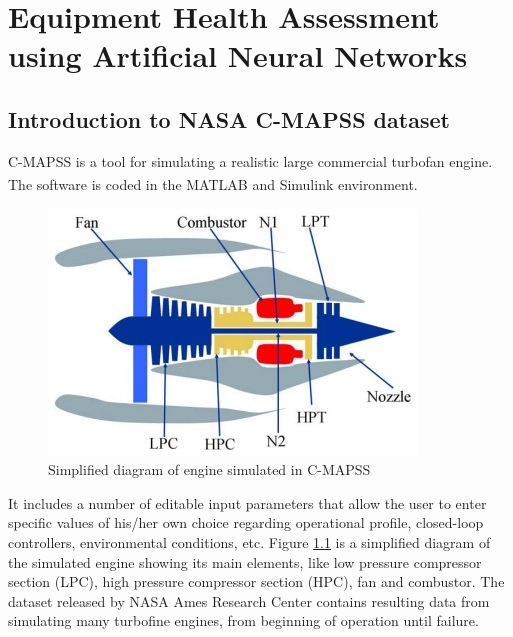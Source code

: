 \chapter{Equipment Health Assessment using Artificial Neural Networks}



\section{Introduction to NASA C-MAPSS dataset}

C-MAPSS is a tool for simulating a realistic large commercial turbofan engine. The software is coded in the MATLAB\textsuperscript{\textregistered} and Simulink\textsuperscript{\textregistered} environment.


\begin{figure}
    \centering
    \includegraphics[width=.48\textwidth]{figures/c-mapss-engine-diagram.jpg}
    \caption{Simplified diagram of engine simulated in C-MAPSS \cite{Saxena2008}}
    \label{figure:c-mapss-engine-diagram}    
\end{figure}
\vspace{-5pt}

It includes a number of editable input parameters that allow the user to enter specific values of his/her own choice regarding operational profile, closed-loop controllers, environmental conditions, etc. \cite{Saxena2008} Figure \ref{figure:c-mapss-engine-diagram} is a simplified diagram of the simulated engine showing its main elements, like low pressure compressor section (LPC), high pressure compressor section (HPC), fan and combustor. The dataset released by NASA Ames Research Center contains resulting data from simulating many turbofine engines, from beginning of operation until failure.


